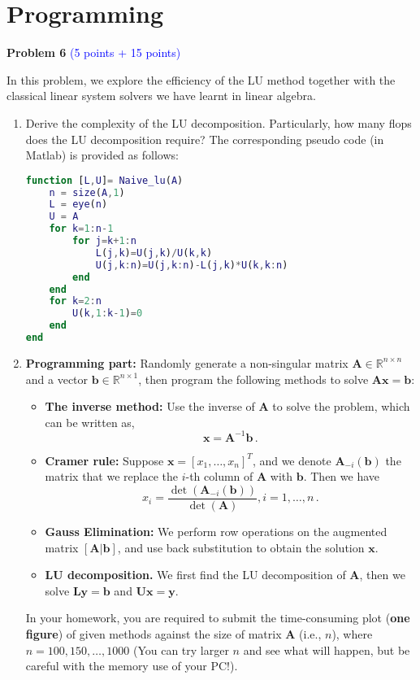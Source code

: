 \documentclass[english,onecolumn]{IEEEtran}
\begin{document}
\newpage
\section{Programming}
\noindent\textbf{Problem 6}
\textcolor{blue}{(5 points + 15 points)}

\noindent In this problem, we explore  the efficiency of the LU method together with the classical linear system solvers we have learnt in linear algebra. 

\begin{enumerate}
	\item Derive the complexity of the LU decomposition. Particularly, how many flops does the LU decomposition require? The corresponding pseudo code (in {\sf Matlab}) is provided as follows: 
\begin{lstlisting}[language=Matlab]
function [L,U]= Naive_lu(A) 
    n = size(A,1)
    L = eye(n)
    U = A 
    for k=1:n-1
        for j=k+1:n
            L(j,k)=U(j,k)/U(k,k)
            U(j,k:n)=U(j,k:n)-L(j,k)*U(k,k:n)
        end
    end
    for k=2:n
        U(k,1:k-1)=0
    end
end
\end{lstlisting}
\item 
\textbf{Programming part:} 
Randomly generate a non-singular matrix $\mathbf{A}\in\mathbb{R}^{n\times n}$ and a vector $\mathbf{b}\in\mathbb{R}^{n\times 1}$, then program the following  methods to solve $\mathbf{Ax=b}$: 
\begin{itemize}
  \item {\bf The inverse method:} Use the inverse of $\mathbf{A}$ to solve the problem, which can be written as,
  \[
  \mathbf{x}=\mathbf{A}^{-1}\mathbf{b}\,.
  \]
  \item {\bf Cramer rule:} Suppose $\mathbf{x}=[x_1,\dots,x_n]^T$, and we denote $\mathbf{A}_{-i}(\mathbf{b})$ the matrix that we replace the $i$-th column of $\mathbf{A}$ with $\mathbf{b}$. Then we have
    \[
      x_i=\frac{\det(\mathbf{A}_{-i}(\mathbf{b}))}{\det(\mathbf{A})}, i=1,\dots,n\,.
    \]
  \item {\bf Gauss Elimination:} We perform row operations on the augmented matrix $[\mathbf{A}|\mathbf{b}]$, and use back substitution to obtain the solution $\mathbf{x}$.
  \item {\bf LU decomposition.} We first find the LU decomposition of $\mathbf{A}$, then we solve $\mathbf{L}\mathbf{y}=\mathbf{b}$ and $\mathbf{U}\mathbf{x}=\mathbf{y}$.
\end{itemize}
In your homework, you are required to submit the time-consuming plot (\textbf{one figure}) of given methods against the size of matrix $\mathbf{A}$ (i.e., $n$), where $n=100, 150,\dots, 1000$ (You can try larger $n$ and see what will happen, but be careful with the memory use of your PC!). 


\end{enumerate}
\end{document}
